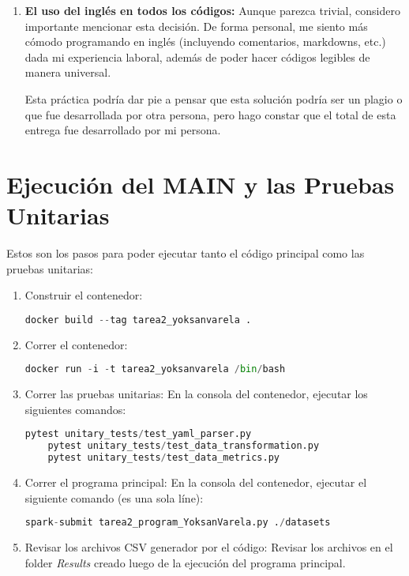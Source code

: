 \documentclass[a4paper]{article}
\begin{document}
\begin{enumerate}
    \item \textbf{El uso del ingl\'{e}s en todos los c\'{o}digos:} Aunque parezca trivial, considero importante mencionar esta decisi\'{o}n. De forma personal, me siento m\'{a}s c\'{o}modo programando en ingl\'{e}s (incluyendo comentarios, markdowns, etc.) dada mi experiencia laboral, adem\'{a}s de poder hacer c\'{o}digos legibles de manera universal.

    Esta pr\'{a}ctica podr\'{i}a dar pie a pensar que esta soluci\'{o}n podr\'{i}a ser un plagio o que fue desarrollada por otra persona, pero hago constar que el total de esta entrega fue desarrollado por mi persona.
\end{enumerate}

\section{Ejecuci\'{o}n del MAIN y las Pruebas Unitarias}
Estos son los pasos para poder ejecutar tanto el c\'{o}digo principal como las pruebas unitarias:
\begin{enumerate}
    \item Construir el contenedor:
    \begin{lstlisting}[language=Python]
    docker build --tag tarea2_yoksanvarela .
    \end{lstlisting}
        
    \item Correr el contenedor:
    \begin{lstlisting}[language=Python]
    docker run -i -t tarea2_yoksanvarela /bin/bash
    \end{lstlisting}

    \item Correr las pruebas unitarias: En la consola del contenedor, ejecutar los siguientes comandos:
    \begin{lstlisting}[language=Python]
    pytest unitary_tests/test_yaml_parser.py
    pytest unitary_tests/test_data_transformation.py
    pytest unitary_tests/test_data_metrics.py
    \end{lstlisting}

    \item Correr el programa principal: En la consola del contenedor, ejecutar el siguiente comando (es una sola l\'{i}ne):
    \begin{lstlisting}[language=Python]
    spark-submit tarea2_program_YoksanVarela.py ./datasets
    \end{lstlisting}

    \item Revisar los archivos CSV generador por el c\'{o}digo: Revisar los archivos en el folder \textit{Results} creado luego de la ejecuci\'{o}n del programa principal.

\end{enumerate}
\end{document}
